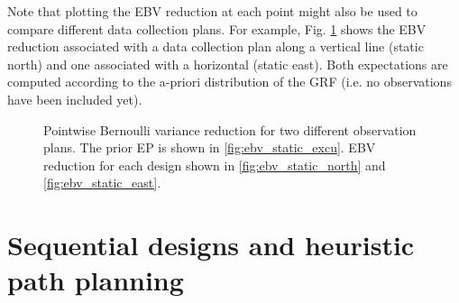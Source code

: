 \documentclass[aoas]{imsart}
\begin{document}
Note that plotting the EBV reduction at each point might also be used
to compare different data collection plans. For example,
Fig. \ref{fig:ebv_north_vs_east} shows the EBV reduction associated
with a data collection plan along a vertical line (static north) and
one associated with a horizontal (static east). Both expectations are
computed according to the a-priori distribution of the GRF (i.e. no
observations have been included yet).


\begin{figure}[!b] 
\centering 
{}
\caption{Pointwise Bernoulli variance reduction for two different
  observation plans. The prior EP is shown in
  \ref{fig:ebv_static_excu}. EBV reduction for each design shown in
  \ref{fig:ebv_static_north} and \ref{fig:ebv_static_east}.}
\label{fig:ebv_north_vs_east}
\end{figure}


\section{Sequential designs and heuristic path planning}
\label{sec:heuristics}
\end{document}
